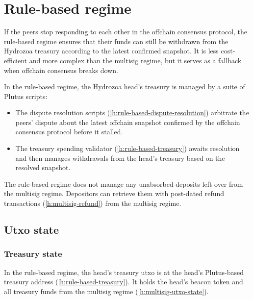 \documentclass[../hydrozoa.tex]{subfiles}
\begin{document}
\section{Rule-based regime}%
\label{h:rule-based-regime}%
If the peers stop responding to each other in the offchain consensus protocol, the rule-based regime ensures that their funds can still be withdrawn from the Hydrozoa treasury according to the latest confirmed snapshot.
It is less cost-efficient and more complex than the multisig regime, but it serves as a fallback when offchain consensus breaks down.

In the rule-based regime, the Hydrozoa head's treasury is managed by a suite of Plutus scripts:
\begin{itemize}
  \item The dispute resolution scripts (\cref{h:rule-based-dispute-resolution}) arbitrate the peers' dispute about the latest offchain snapshot confirmed by the offchain consensus protocol before it stalled.
  \item The treasury spending validator (\cref{h:rule-based-treasury}) awaits resolution and then manages withdrawals from the head's treasury based on the resolved snapshot.
\end{itemize}

The rule-based regime does not manage any unabsorbed deposits left over from the multisig regime.
Depositors can retrieve them with post-dated refund transactions (\cref{h:multisig-refund}) from the multisig regime.

\subsection{Utxo state}%
\label{h:rule-based-utxo-state}

\subsubsection{Treasury state}

In the rule-based regime, the head's treasury utxo is at the head's Plutus-based treasury address (\cref{h:rule-based-treasury}).
It holds the head's beacon token and all treasury funds from the multisig regime (\cref{h:multisig-utxo-state}).
\end{document}
